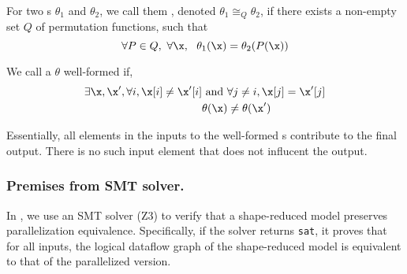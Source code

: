 \begin{definition}[\CF{\kerneq}]
For two \kfunc{}s $\theta_1$ and $\theta_2$,
we call them , denoted $\theta_1 \cong_Q \theta_2$,
if there exists a non-empty set $Q$ of permutation functions,
such that
\[
\forall P\in Q,\ \forall \x, \ \ \theta_1(\x) = \theta_2(P(\x))
\]
    \label{def:kerneq}
\end{definition}







\begin{definition}
We call a \kfunc $\theta$ well-formed if,
    \begin{align*}
        \exists \x,\x', \forall i, \x[i] \neq \x'[i] &\text{ and } \forall j\neq i, \x[j]=\x'[j]\\
        & \theta(\x) \neq \theta(\x')
    \end{align*}
    \label{def:wellform}
\end{definition}

Essentially, all elements in the inputs to the well-formed \kfunc{}s
contribute to the final output.
There is no such input element that does not influcent the output.




\subsubsection{Premises from SMT solver.}
In \sys, we use an SMT solver (Z3) to verify that a shape-reduced model preserves parallelization equivalence.
Specifically, if the solver returns \texttt{sat}, it proves that for all inputs,
the logical dataflow graph of the shape-reduced model is equivalent to that of the parallelized version.

